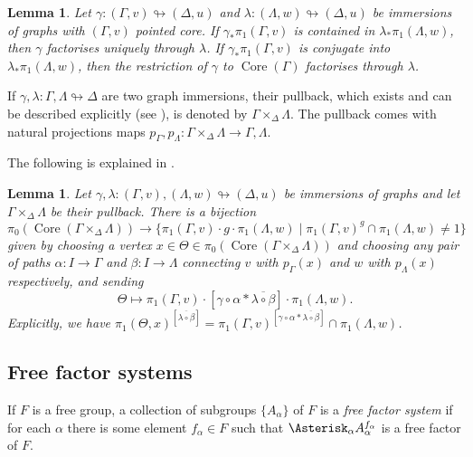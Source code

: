 \documentclass[11pt, a4paper]{amsart}
\newtheorem{lemma}[theorem]{Lemma}
\theoremstyle{definition}
\def\immerses{\looparrowright}
\DeclareMathOperator{\core}{Core}
\begin{document}
\begin{lemma}
\label{lem:factorise}
Let $\gamma\colon(\Gamma, v)\immerses(\Delta, u)$ and $\lambda\colon (\Lambda, w)\immerses(\Delta, u)$ be immersions of graphs with $(\Gamma, v)$ pointed core. If $\gamma_*\pi_1(\Gamma, v)$ is contained in $\lambda_*\pi_1(\Lambda, w)$, then $\gamma$ factorises uniquely through $\lambda$. If $\gamma_*\pi_1(\Gamma, v)$ is conjugate into $\lambda_*\pi_1(\Lambda, w)$, then the restriction of $\gamma$ to $\core(\Gamma)$ factorises through $\lambda$.
\end{lemma}



If $\gamma, \lambda\colon \Gamma, \Lambda\immerses\Delta$ are two graph immersions, their pullback, which exists and can be described explicitly (see \cite{St83}), is denoted by $\Gamma\times_{\Delta}\Lambda$. The pullback comes with natural projections maps $p_{\Gamma}, p_{\Lambda}\colon \Gamma\times_{\Delta}\Lambda\to \Gamma, \Lambda$.


The following is explained in \cite{St83}.

\begin{lemma}
\label{lem:double_coset}
Let $\gamma, \lambda\colon(\Gamma, v), (\Lambda, w)\immerses(\Delta, u)$ be immersions of graphs and let $\Gamma\times_{\Delta}\Lambda$ be their pullback. There is a bijection
\[
\pi_0(\core(\Gamma\times_{\Delta}\Lambda)) \to \{ \pi_1(\Gamma, v)\cdot g\cdot \pi_1(\Lambda, w) \mid \pi_1(\Gamma, v)^g\cap \pi_1(\Lambda, w) \neq 1\}
\]
given by choosing a vertex $x\in \Theta\in \pi_0(\core(\Gamma\times_{\Delta}\Lambda))$ and choosing any pair of paths $\alpha\colon I\to \Gamma$ and $\beta\colon I\to \Lambda$ connecting $v$ with $p_{\Gamma}(x)$ and $w$ with $p_{\Lambda}(x)$ respectively, and sending
\[
\Theta \mapsto \pi_1(\Gamma, v)\cdot [\gamma\circ\alpha*\overline{\lambda\circ\beta}]\cdot \pi_1(\Lambda, w).
\]
Explicitly, we have $\pi_1(\Theta, x)^{[\overline{\lambda\circ\beta}]} = \pi_1(\Gamma, v)^{[\gamma\circ\alpha*\overline{\lambda\circ\beta}]}\cap \pi_1(\Lambda, w)$.
\end{lemma}

\subsection{Free factor systems}



If $F$ is a free group, a collection of subgroups $\{A_{\alpha}\}$ of $F$ is a \emph{free factor system} if for each $\alpha$ there is some element $f_{\alpha}\in F$ such that $\Asterisk_{\alpha}A_{\alpha}^{f_{\alpha}}$ is a free factor of $F$.
\end{document}
